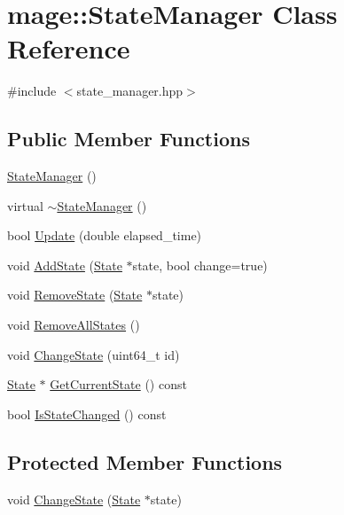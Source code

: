 \hypertarget{classmage_1_1_state_manager}{}\section{mage\+:\+:State\+Manager Class Reference}
\label{classmage_1_1_state_manager}


{\ttfamily \#include $<$state\+\_\+manager.\+hpp$>$}

\subsection*{Public Member Functions}
\begin{DoxyCompactItemize}
\item 
\hyperlink{classmage_1_1_state_manager_a6c4504d0b50fe671299b080f3be30c8e}{State\+Manager} ()
\item 
virtual \hyperlink{classmage_1_1_state_manager_a1234b6c121a580eeec8f60611b4d16d4}{$\sim$\+State\+Manager} ()
\item 
bool \hyperlink{classmage_1_1_state_manager_a48498596d478d107621b1752104e02e3}{Update} (double elapsed\+\_\+time)
\item 
void \hyperlink{classmage_1_1_state_manager_ae5711ea7782384bc52b09a14cf1f3f5d}{Add\+State} (\hyperlink{classmage_1_1_state}{State} $\ast$state, bool change=true)
\item 
void \hyperlink{classmage_1_1_state_manager_ad1589f7792508f0568f673b925a2bdba}{Remove\+State} (\hyperlink{classmage_1_1_state}{State} $\ast$state)
\item 
void \hyperlink{classmage_1_1_state_manager_a956a4250f7d2e8bd95b38f314a3c1f77}{Remove\+All\+States} ()
\item 
void \hyperlink{classmage_1_1_state_manager_a2dfcae20e58167786a2772f204951657}{Change\+State} (uint64\+\_\+t id)
\item 
\hyperlink{classmage_1_1_state}{State} $\ast$ \hyperlink{classmage_1_1_state_manager_ab3a37b1ef0d2e9960ff4c98747c64d3f}{Get\+Current\+State} () const
\item 
bool \hyperlink{classmage_1_1_state_manager_abd9c136e1a0f7e375450be5e50e2fc64}{Is\+State\+Changed} () const
\end{DoxyCompactItemize}
\subsection*{Protected Member Functions}
\begin{DoxyCompactItemize}
\item 
void \hyperlink{classmage_1_1_state_manager_aef491583e2e15f59aec1b98be1406fe5}{Change\+State} (\hyperlink{classmage_1_1_state}{State} $\ast$state)
\end{DoxyCompactItemize}
